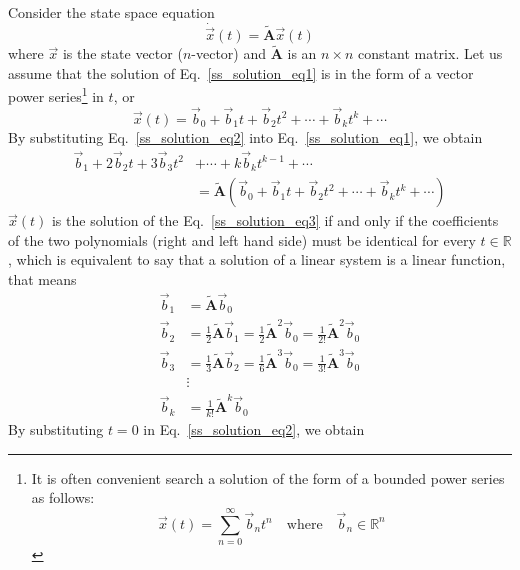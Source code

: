 \documentclass[12pt,a4paper,oneside]{book}
\begin{document}
\begin{onehalfspace}
Consider the state space equation
\begin{equation}\label{ss_solution_eq1}
	\dot{\vec{x}}(t)=\tilde{\mathbf{A}}\vec{x}(t)
\end{equation}
where $\vec{x}$ is the state vector ($n$-vector) and $\tilde{\mathbf{A}}$ is an 
$n \times n$ constant matrix. Let us assume that the solution of 
Eq.~\eqref{ss_solution_eq1} is in the form of a vector power series\footnote{It 
is often convenient search a solution of the form of a bounded power series as 
follows: $$\vec{x}(t)=\sum_{n=0}^{\infty}\vec{b}_nt^n \quad\text{where} 
\quad\vec{b}_n \in\mathbb{R}^n $$} in $t$, or
\begin{equation}\label{ss_solution_eq2}
	{\vec{x}(t)}=\vec{b}_0+\vec{b}_1t+\vec{b}_2t^2+\cdots+\vec{b}_kt^k+\cdots
\end{equation}
By substituting Eq.~\eqref{ss_solution_eq2} into Eq.~\eqref{ss_solution_eq1}, we obtain 
\begin{equation}\label{ss_solution_eq3}
	\begin{aligned}
		\vec{b}_1+2\vec{b}_2t+3\vec{b}_3t^2&+\cdots+k\vec{b}_kt^{k-1}+\cdots\\[6pt]
		&= \tilde{\mathbf{A}}\left(\vec{b}_0+\vec{b}_1t+\vec{b}_2t^2+\cdots+\vec{b}_kt^k+\cdots\right)
	\end{aligned}
\end{equation}
$\vec{x}(t)$ is the solution of the Eq.~\eqref{ss_solution_eq3} if and only if 
the coefficients of the two polynomials (right and left hand side) must be 
identical for every $t\in\mathbb{R}$, which is equivalent to say that a solution of a linear system is a linear function, that means
\begin{equation}\label{ss_solution_eq4}
	\begin{aligned}
		\vec{b}_1 &= \tilde{\mathbf{A}}\vec{b}_0 \\[6pt]
		\vec{b}_2 &= \frac{1}{2}\tilde{\mathbf{A}}\vec{b}_1 = \frac{1}{2}\tilde{\mathbf{A}}^2\vec{b}_0 = \frac{1}{2!}\tilde{\mathbf{A}}^2\vec{b}_0 \\[6pt]
		\vec{b}_3 &= \frac{1}{3}\tilde{\mathbf{A}}\vec{b}_2 = \frac{1}{6}\tilde{\mathbf{A}}^3\vec{b}_0 = \frac{1}{3!}\tilde{\mathbf{A}}^3\vec{b}_0 \\[6pt]
		&\vdots \\[6pt]
		\vec{b}_k &= \frac{1}{k!}\tilde{\mathbf{A}}^k\vec{b}_0
	\end{aligned}
\end{equation}
By substituting $t=0$ in Eq.~\eqref{ss_solution_eq2}, we obtain 
\begin{equation}\label{ss_solution_eq5}

\end{equation}
\end{onehalfspace}
\end{document}
